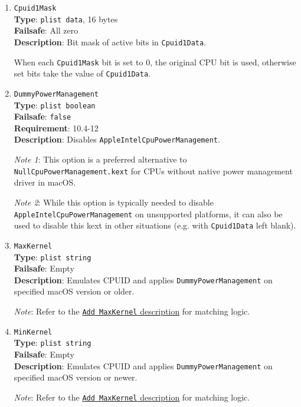 \documentclass[]{article}
\begin{document}
\begin{enumerate}
\item
  \texttt{Cpuid1Mask}\\
  \textbf{Type}: \texttt{plist\ data}, 16 bytes\\
  \textbf{Failsafe}: All zero\\
  \textbf{Description}: Bit mask of active bits in \texttt{Cpuid1Data}.

  When each \texttt{Cpuid1Mask} bit is set to 0, the original CPU bit is used,
  otherwise set bits take the value of \texttt{Cpuid1Data}.

\item
  \texttt{DummyPowerManagement}\\
  \textbf{Type}: \texttt{plist\ boolean}\\
  \textbf{Failsafe}: \texttt{false}\\
  \textbf{Requirement}: 10.4-12\\
  \textbf{Description}: Disables \texttt{AppleIntelCpuPowerManagement}.

  \emph{Note 1}: This option is a preferred alternative to
  \texttt{NullCpuPowerManagement.kext} for CPUs without native power
  management driver in macOS.

  \emph{Note 2}: While this option is typically needed to disable \texttt{AppleIntelCpuPowerManagement}
  on unsupported platforms, it can also be used to disable this kext in other situations
  (e.g. with \texttt{Cpuid1Data} left blank).

\item
  \texttt{MaxKernel}\\
  \textbf{Type}: \texttt{plist\ string}\\
  \textbf{Failsafe}: Empty\\
  \textbf{Description}: Emulates CPUID and applies \texttt{DummyPowerManagement} on specified macOS version or older.

  \emph{Note}: Refer to the \hyperlink{kernmatch}{\texttt{Add\ MaxKernel} description} for matching logic.

\item
  \texttt{MinKernel}\\
  \textbf{Type}: \texttt{plist\ string}\\
  \textbf{Failsafe}: Empty\\
  \textbf{Description}: Emulates CPUID and applies \texttt{DummyPowerManagement} on specified macOS version or newer.

  \emph{Note}: Refer to the \hyperlink{kernmatch}{\texttt{Add\ MaxKernel} description} for matching logic.

\end{enumerate}
\end{document}
